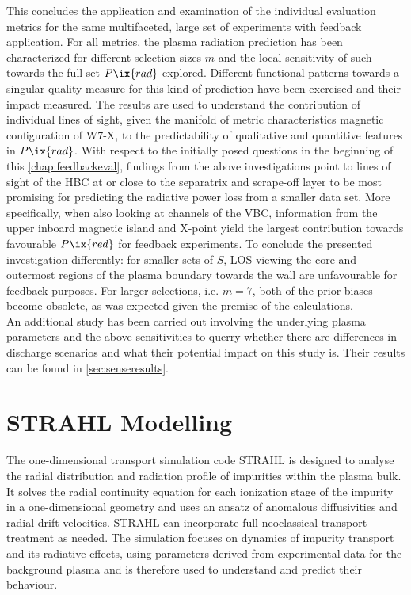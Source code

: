                 This concludes the application and examination of the individual evaluation metrics for the same multifaceted, large set of experiments with feedback application. For all metrics, the plasma radiation prediction has been characterized for different selection sizes $m$ and the local sensitivity of such towards the full set $P\ix{rad}$ explored. Different functional patterns towards a singular quality measure for this kind of prediction have been exercised and their impact measured. The results are used to understand the contribution of individual lines of sight, given the manifold of metric characteristics magnetic configuration of W7-X, to the predictability of qualitative and quantitive features in $P\ix{rad}$. With respect to the initially posed questions in the beginning of this \cref{chap:feedbackeval}, findings from the above investigations point to lines of sight of the HBC at or close to the separatrix and scrape-off layer to be most promising for predicting the radiative power loss from a smaller data set. More specifically, when also looking at channels of the VBC, information from the upper inboard magnetic island and X-point yield the largest contribution towards favourable $P\ix{red}$ for feedback experiments. To conclude the presented investigation differently: for smaller sets of $S$, LOS viewing the core and outermost regions of the plasma boundary towards the wall are unfavourable for feedback purposes. For larger selections, i.e. $m=7$, both of the prior biases become obsolete, as was expected given the premise of the calculations.\\%
                An additional study has been carried out involving the underlying plasma parameters and the above sensitivities to querry whether there are differences in discharge scenarios and what their potential impact on this study is. Their results can be found in \cref{sec:senseresults}.%
%
%
    \section{STRAHL Modelling}\label{sec:strahlmodel}%
%
            The one-dimensional transport simulation code STRAHL is designed to analyse the radial distribution and radiation profile of impurities within the plasma bulk. It solves the radial continuity equation for each ionization stage of the impurity in a one-dimensional geometry and uses an ansatz of anomalous diffusivities and radial drift velocities. STRAHL can incorporate full neoclassical transport treatment as needed. The simulation focuses on dynamics of impurity transport and its radiative effects, using parameters derived from experimental data for the background plasma and is therefore used to understand and predict their behaviour.%
%
